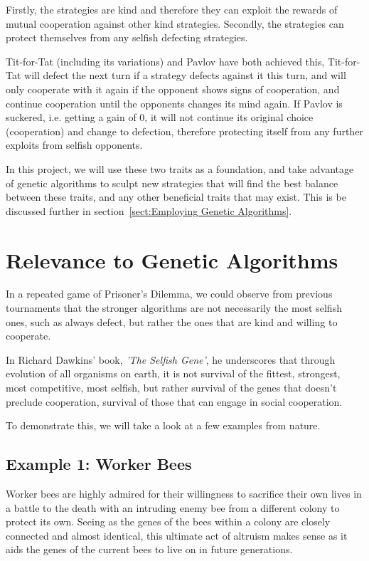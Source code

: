 \documentclass{icldt}
\numberwithin{equation}{section}       %
\begin{document}
Firstly, the strategies are kind and therefore they can exploit the rewards of mutual cooperation against other kind strategies. Secondly, the strategies can protect themselves from any selfish defecting strategies.

Tit-for-Tat (including its variations) and Pavlov have both achieved this, Tit-for-Tat will defect the next turn if a strategy defects against it this turn, and will only cooperate with it again if the opponent shows signs of cooperation, and continue cooperation until the opponents changes its mind again. If Pavlov is suckered, i.e. getting a gain of 0, it will not continue its original choice (cooperation) and change to defection, therefore protecting itself from any further exploits from selfish opponents.

In this project, we will use these two traits as a foundation, and take advantage of genetic algorithms to sculpt new strategies that will find the best balance between these traits, and any other beneficial traits that may exist. This is be discussed further in section~\ref{sect:Employing Genetic Algorithms}.
\section{Relevance to Genetic Algorithms}
\label{sect:Relevance to Genetic Algorithms}
In a repeated game of Prisoner's Dilemma, we could observe from previous tournaments that the stronger algorithms are not necessarily the most selfish ones, such as always defect, but rather the ones that are kind and willing to cooperate. 

In Richard Dawkins' book, \emph{'The Selfish Gene'}, he underscores that through evolution of all organisms on earth, it is not survival of the fittest, strongest, most competitive, most selfish, but rather survival of the genes that doesn't preclude cooperation, survival of those that can engage in social cooperation. \cite{dawkins1976}

To demonstrate this, we will take a look at a few examples from nature. 
\subsection{Example 1: Worker Bees}
\label{sect:Worker Bees}
Worker bees are highly admired for their willingness to sacrifice their own lives in a battle to the death with an intruding enemy bee from a different colony to protect its own. Seeing as the genes of the bees within a colony are closely connected and almost identical, this ultimate act of altruism makes sense as it aids the genes of the current bees to live on in future generations. \cite{niceguys}
\end{document}

